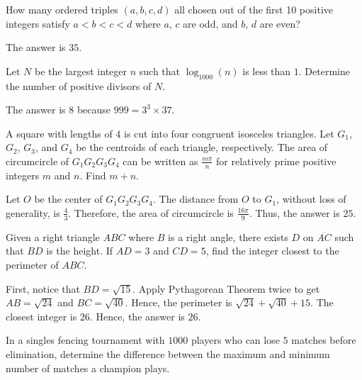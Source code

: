 \begin{problem}
How many ordered triples $(a,b,c,d)$ all chosen out of the first 10 positive integers satisfy $a<b<c<d$ where $a$, $c$ are odd, and $b$, $d$ are even?
\end{problem}

\begin{solution}
The answer is $35$.
\end{solution}

\begin{problem}
Let $N$ be the largest integer $n$ such that $\log_{1000}(n)$ is less than $1$. Determine the number of positive divisors of $N$.
\end{problem}

\begin{solution}
The answer is $8$ because $999=3^3\times37$.
\end{solution}

\begin{problem}
A square with lengths of $4$ is cut into four congruent isosceles triangles. Let $G_1$, $G_2$, $G_3$, and $G_4$ be the centroids of each triangle, respectively. The area of circumcircle of $G_1G_2G_3G_4$ can be written as $\frac{m\pi}{n}$ for relatively prime positive integers $m$ and $n$. Find $m+n$.
\end{problem}

\begin{solution}
Let $O$ be the center of $G_1G_2G_3G_4$. The distance from $O$ to $G_1$, without loss of generality, is $\frac{4}{3}$. Therefore, the area of circumcircle is $\frac{16\pi}{9}$. Thus, the answer is $25$.
\end{solution}

\begin{problem}
Given a right triangle $ABC$ where $B$ is a right angle, there exists $D$ on $\overline{AC}$ such that $BD$ is the height. If $AD=3$ and $CD=5$, find the integer closest to the perimeter of $ABC$.
\end{problem}

\begin{solution}
First, notice that $BD=\sqrt{15}$. Apply Pythagorean Theorem twice to get $AB=\sqrt{24}$ and $BC=\sqrt{40}$. Hence, the perimeter is $\sqrt{24}+\sqrt{40}+15$. The closest integer is $26$. Hence, the answer is $26$.
\end{solution}

\begin{problem}
In a singles fencing tournament with $1000$ players who can lose $5$ matches before elimination, determine the difference between the maximum and minimum number of matches a champion plays.
\end{problem}

